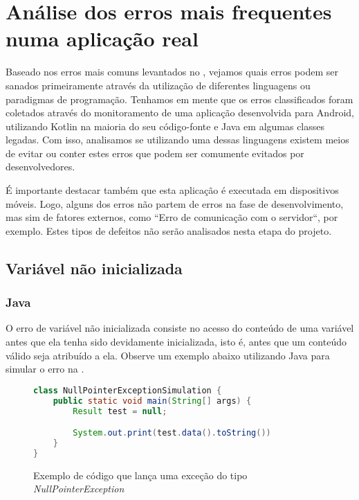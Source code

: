 \chapter{Análise dos erros mais frequentes numa aplicação real}\label{cap:most_common_errors_analysis}

Baseado nos erros mais comuns levantados no , vejamos quais erros podem ser sanados primeiramente através da utilização de diferentes linguagens ou paradigmas de programação. Tenhamos em mente que os erros classificados foram coletados através do monitoramento de uma aplicação desenvolvida para Android, utilizando Kotlin na maioria do seu código-fonte e Java em algumas classes legadas. Com isso, analisamos se utilizando uma dessas linguagens existem meios de evitar ou conter estes erros que podem ser comumente evitados por desenvolvedores.

É importante destacar também que esta aplicação é executada em dispositivos móveis. Logo, alguns dos erros não partem de erros na fase de desenvolvimento, mas sim de fatores externos, como ``Erro de comunicação com o servidor``, por exemplo. Estes tipos de defeitos não serão analisados nesta etapa do projeto.

\section{Variável não inicializada}

\subsection{Java}

O erro de variável não inicializada consiste no acesso do conteúdo de uma variável antes que ela tenha sido devidamente inicializada, isto é, antes que um conteúdo válido seja atribuído a ela. Observe um exemplo abaixo utilizando Java para simular o erro na .

\begin{figure}[H]
    \centering
    \begin{lstlisting}[language=Java]
class NullPointerExceptionSimulation {
    public static void main(String[] args) {
        Result test = null;

        System.out.print(test.data().toString())
    }
}
    \end{lstlisting}
    \caption{Exemplo de código que lança uma exceção do tipo \textit{NullPointerException}}
    \label{fig:java_npe_code}
\end{figure}

